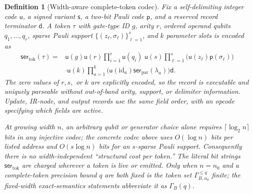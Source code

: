 \documentclass[aps,prx,reprint,floatfix,superscriptaddress]{revtex4-2}
\newtheorem{definition}{Definition}
\begin{document}
\begin{definition}[Width-aware complete-token codec]
\label{def:token-codec}
Fix a self-delimiting integer code $\mathsf u$, a signed variant
$\mathsf s$, a two-bit Pauli code $\mathsf p$, and a reserved record
terminator $\mathsf d$.  A token $\tau$ with gate-type ID $g$, arity $r$,
ordered operand qubits $q_1,\ldots,q_r$, sparse Pauli support
$\{(z_\ell,\sigma_\ell)\}_{\ell=1}^{s}$, and $k$ parameter slots is encoded
as
\begin{equation*}
\begin{aligned}
\mathsf{ser}_{\mathrm{tok}}(\tau)
={}&\mathsf u(g)\mathsf u(r)
  \prod_{i=1}^{r}\mathsf u(q_i)\;\mathsf u(s)
  \prod_{\ell=1}^{s}
    \bigl(\mathsf u(z_\ell)\mathsf p(\sigma_\ell)\bigr)\\
 &\cdot\mathsf u(k)
  \prod_{a=1}^{k}
    \bigl(\mathsf u(\mathrm{id}_a)
           \mathsf{ser}_{\mathrm{par}}(\lambda_a)\bigr)\mathsf d .
\end{aligned}
\end{equation*}
The zero values of $r,s,$ or $k$ are explicitly encoded, so the record is
executable and uniquely parseable without out-of-band arity, support, or
delimiter information.  Update, IR-node, and output records use the same
field order, with an opcode specifying which fields are active.

At growing width $n$, an arbitrary qubit or generator choice alone requires
$\lceil\log_2 n\rceil$ bits in any injective codec; the concrete codec above
uses $O(\log n)$ bits per listed address and $O(s\log n)$ bits for an
$s$-sparse Pauli support.  Consequently there is no width-independent
``structural cost per token.''  The literal bit strings
$\mathsf{ser}_{\mathrm{tok}}$ are charged wherever a token is live or
emitted.  Only when $n=n_0$ and a complete-token precision bound $q$ are
both fixed is the token set $\Gamma_{B,n_0}^{\leq q}$ finite; the
fixed-width exact-semantics statements abbreviate it as $\Gamma_B(q)$.
\end{definition}
\end{document}
